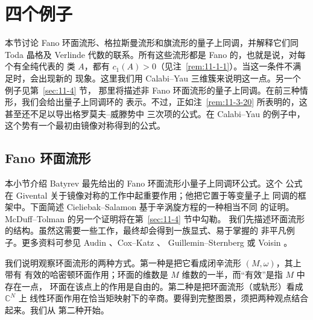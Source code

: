 
\section{四个例子}\label{sec:11-3}

本节讨论 Fano 环面流形、格拉斯曼流形和旗流形的量子上同调，并解释它们同 Toda
晶格及 Verlinde 代数的联系。所有这些流形都是 Fano 的，也就是说，对每个有全纯代表的
类 $A$，都有 $c_1(A)>0$（见注~\ref{rem:11-1-1}）。当这一条件不满足时，会出现新的
现象。这里我们用 Calabi--Yau 三维簇来说明这一点。另一个例子见第~\ref{sec:11-4} 节，
那里将描述非 Fano 环面流形的量子上同调。在前三种情形，我们会给出量子上同调环的
表示。不过，正如注~\ref{rem:11-3-20} 所表明的，这甚至还不足以导出格罗莫夫--威滕势中
三次项的公式。在 Calabi--Yau 的例子中，这个势有一个最初由镜像对称得到的公式。

\subsection{Fano 环面流形}\label{subsec:11-3-1}

本小节介绍 Batyrev  最先给出的 Fano 环面流形小量子上同调环公式。这个
公式在 Givental  关于镜像对称的工作中起重要作用；他把它置于等变量子上
同调的框架中。下面简述 Cieliebak--Salamon  基于辛涡旋方程的一种相当不同
的证明。McDuff--Tolman  的另一个证明将在第~\ref{sec:11-4} 节中勾勒。
我们先描述环面流形的结构。虽然这需要一些工作，最终却会得到一族显式、易于掌握的
非平凡例子。更多资料可参见 Audin 、Cox--Katz 、
Guillemin--Sternberg  或 Voisin 。

我们说明观察环面流形的两种方式。第一种是把它看成闭辛流形 $(M,\omega)$，其上带有
有效的哈密顿环面作用；环面的维数是 $M$ 维数的一半，而“有效”是指 $M$ 中存在一点，
环面在该点上的作用是自由的。第二种是把环面流形（或轨形）看成 $\mathbb C^N$ 上
线性环面作用在恰当矩映射下的辛商。要得到完整图景，须把两种观点结合起来。我们从
第二种开始。

